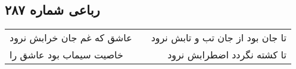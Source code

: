 \begin{center}
\section*{رباعی شماره ۲۸۷}
\label{sec:sh287}
\begin{longtable}{l p{0.5cm} r}
عاشق که غم جان خرابش نرود
&&
تا جان بود از جان تب و تابش نرود
\\
خاصیت سیماب بود عاشق را
&&
تا کشته نگردد اضطرابش نرود
\\
\end{longtable}
\end{center}
